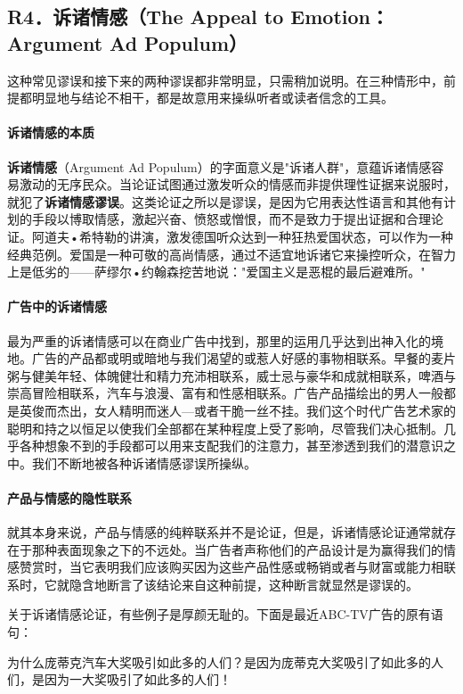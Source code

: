\subsection{R4．诉诸情感（The Appeal to Emotion：Argument Ad Populum）}

这种常见谬误和接下来的两种谬误都非常明显，只需稍加说明。在三种情形中，前提都明显地与结论不相干，都是故意用来操纵听者或读者信念的工具。

\paragraph{诉诸情感的本质}
\textbf{诉诸情感}（Argument Ad Populum）的字面意义是"诉诸人群"，意蕴诉诸情感容易激动的无序民众。当论证试图通过激发听众的情感而非提供理性证据来说服时，就犯了\textbf{诉诸情感谬误}。这类论证之所以是谬误，是因为它用表达性语言和其他有计划的手段以博取情感，激起兴奋、愤怒或憎恨，而不是致力于提出证据和合理论证。阿道夫•希特勒的讲演，激发德国听众达到一种狂热爱国状态，可以作为一种经典范例。爱国是一种可敬的高尚情感，通过不适宜地诉诸它来操控听众，在智力上是低劣的——萨缪尔•约翰森挖苦地说："爱国主义是恶棍的最后避难所。"

\paragraph{广告中的诉诸情感}
最为严重的诉诸情感可以在商业广告中找到，那里的运用几乎达到出神入化的境地。广告的产品都或明或暗地与我们渴望的或惹人好感的事物相联系。早餐的麦片粥与健美年轻、体魄健壮和精力充沛相联系，威士忌与豪华和成就相联系，啤酒与崇高冒险相联系，汽车与浪漫、富有和性感相联系。广告产品描绘出的男人一般都是英俊而杰出，女人精明而迷人—或者干脆一丝不挂。我们这个时代广告艺术家的聪明和持之以恒足以使我们全部都在某种程度上受了影响，尽管我们决心抵制。几乎各种想象不到的手段都可以用来支配我们的注意力，甚至渗透到我们的潜意识之中。我们不断地被各种诉诸情感谬误所操纵。

\paragraph{产品与情感的隐性联系}
就其本身来说，产品与情感的纯粹联系并不是论证，但是，诉诸情感论证通常就存在于那种表面现象之下的不远处。当广告者声称他们的产品设计是为赢得我们的情感赞赏时，当它表明我们应该购买因为这些产品性感或畅销或者与财富或能力相联系时，它就隐含地断言了该结论来自这种前提，这种断言就显然是谬误的。

关于诉诸情感论证，有些例子是厚颜无耻的。下面是最近ABC-TV广告的原有语句：

为什么庞蒂克汽车大奖吸引如此多的人们？是因为庞蒂克大奖吸引了如此多的人们，是因为一大奖吸引了如此多的人们！

